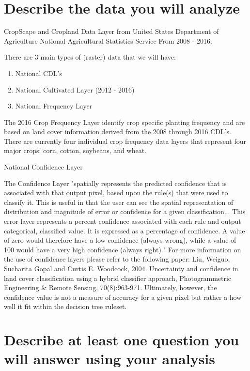\documentclass[10pt,letterpaper]{article}
\begin{document}
\section{Describe the data you will analyze}

CropScape and Cropland Data Layer from
United States Department of Agriculture
National Agricultural Statistics Service From 2008 - 2016.

There are 3 main types of (raster) data that we will have:

\begin{enumerate}
	\item National CDL's
	\item National Cultivated Layer (2012 - 2016)
	\item National Frequency Layer
\end{enumerate}

The 2016 Crop Frequency Layer identify crop specific planting frequency and are based on land cover information derived from the 2008 through 2016 CDL's. There are currently four individual crop frequency data layers that represent four major crops: corn, cotton, soybeans, and wheat.

National Confidence Layer

The Confidence Layer "spatially represents the predicted confidence that is associated with that output pixel, based upon the rule(s) that were used to classify it. This is useful in that the user can see the spatial representation of distribution and magnitude of error or confidence for a given classification... This error layer represents a percent confidence associated with each rule and output categorical, classified value. It is expressed as a percentage of confidence. A value of zero would therefore have a low confidence (always wrong), while a value of 100 would have a very high confidence (always right)." For more information on the use of confidence layers please refer to the following paper: Liu, Weiguo, Sucharita Gopal and Curtis E. Woodcock, 2004. Uncertainty and confidence in land cover classification using a hybrid classifier approach, Photogrammetric Engineering \& Remote Sensing, 70(8):963-971. Ultimately, however, the confidence value is not a measure of accuracy for a given pixel but rather a how well it fit within the decision tree ruleset.

\section{Describe at least one question you will answer using your analysis}
\end{document}
